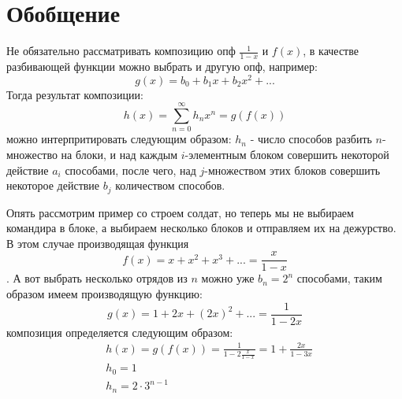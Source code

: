 \section{Обобщение}

Не обязательно рассматривать композицию опф $\frac{1}{1-x}$ и $f\left(x\right)$, в качестве разбивающей функции можно выбрать и другую опф, например:
\[
	g\left(x\right) = b_0 + b_1 x + b_2 x^2 + ...
\]
Тогда результат композиции:
\[
	h\left(x\right) = \sum_{n=0}^\infty h_n x^n = g\left(f\left(x\right)\right)
\]
можно интерпритировать следующим образом: $h_n$ - число способов разбить $n$- множество на блоки, и над каждым $i$-элементным блоком совершить некоторой действие $a_i$ способами, после чего, над $j$-множеством этих блоков совершить некоторое действие $b_j$ количеством способов.

Опять рассмотрим пример со строем солдат, но теперь мы не выбираем командира в блоке, а выбираем несколько блоков и отправляем их на дежурство. В этом случае производящая функция $$ f\left(x\right) = x + x^2 + x^3 + ... = \frac{x}{1-x} $$. А вот выбрать несколько отрядов из $n$ можно уже $b_n = 2^n$ способами, таким образом имеем производящую функцию:
\[
	g\left(x\right) = 1 + 2x + \left(2x\right)^2 + ... = \frac{1}{1-2x}
\]
композиция определяется следующим образом:
\[
	\begin{split}
		& h\left(x\right) = g\left(f\left(x\right)\right) = \frac{1}{1 - 2\frac{x}{1-x}} = 1 + \frac{2x}{1-3x}\\
		& h_0 = 1\\
		& h_n = 2\cdot3^{n-1}
	\end{split}
\]
